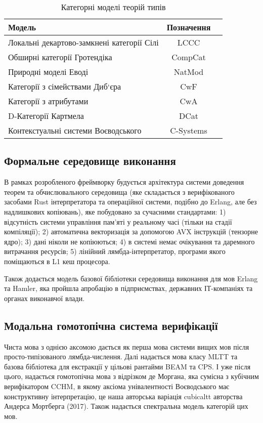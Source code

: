 \begin{table}[ht]
 \caption{Категорні моделі теорій типів}
  \begin{tabular}{lcc}
    \hline
\rowcolor{ZimaBlue}
 \textbf{Модель} & \textbf{Позначення} & \\
    \hline
 Локальні декартово-замкнені категорії Сілі & LCCC & \\
 Обширні категорії Гротендіка               & CompCat & \\
 Природні моделі Еводі                      & NatMod & \\
 Категорії з сімействами Диб`єра            & CwF & \\
 Категорії з атрибутами                     & CwA & \\
 D-Категорії Картмела                       & DCat & \\
 Контекстуальні системи Воєводського        & C-Systems & \\
    \hline
  \end{tabular}
\end{table}

\subsection{Формальне середовище виконання}
В рамках розробленого фреймворку будується
архітектура системи доведення теорем та обчислювального
середовища (яке складається з верифікованого засобами Rust
інтерпретатора та операційної системи, подібно до Erlang, але без надлишкових копіювань),
яке побудовано за сучасними стандартами:
1) відсутність системи управління пам'яті у реальному часі (тільки на стадії компіляції);
2) автоматична векторизація за допомогою AVX інструкцій (тензорне ядро);
3) дані ніколи не копіюються;
4) в системі немає очікування та даремного витрачання ресурсів;
5) лінійний лямбда-інтерпретатор, програми якого поміщаються в L1 кеш процесора.

Також додається модель базової бібліотеки середовища виконання для мов Erlang та Hamler,
яка пройшла апробацію в підприємствах, державних ІТ-компаніях та органах виконавчої влади.

\subsection{Модальна гомотопічна система верифікації}
Чиста мова з однією аксомою дається як перша мова системи вищих мов після просто-типізованого лямбда-числення.
Далі надається мова класу MLTT та базова бібліотека для екстракції у цільові рантайми BEAM та CPS.
І уже після цього, надається гомотопічна мова з відрізком де Моргана, яка сумісна з кубічним верифікатором CCHM,
в якому аксіома унівалентності Воєводського має конструктивну інтерпретацію,
це наша авторська варіація cubicaltt авторства Андерса Мортберга (2017).
Також надається спектральна модель категорій цих мов.

